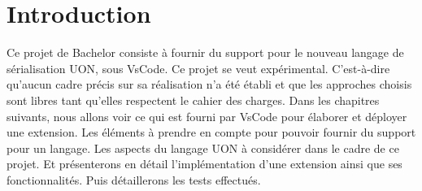\documentclass[
    iict, %
    il, %
]{heig-tb}
\begin{document}
\maketitle
\frontmatter
\clearemptydoublepage

\preamble
\let\cleardoublepage\clearpage
\authentification
\let\cleardoublepage\clearpage

\begin{abstract}
    
\end{abstract}

\listoffigures
{}
\listoflistings
{}

\tableofcontents

\printnomenclature
\clearemptydoublepage
{}

\pagestyle{fancy}
\fancyhf{}
\renewcommand\headrulewidth{1pt}

\fancyhead[L]{\itshape\nouppercase{\leftmark}}

\renewcommand{\chaptermark}[1]{\markboth{\MakeUppercase{#1}}{}}

\renewcommand\footrulewidth{1pt}


\renewcommand{\headrulewidth}{0.4pt}
\renewcommand{\footrulewidth}{0.4pt}

\titlespacing*{\chapter}{0pt}{-40pt}{20pt}


\mainmatter
\chapter{Introduction}
Ce projet de Bachelor consiste à fournir du support pour le nouveau langage de sérialisation UON, sous VsCode. Ce projet se veut expérimental. C'est-à-dire qu'aucun cadre précis sur sa réalisation n'a été établi et que les approches choisis sont libres tant qu'elles respectent le cahier des charges.
Dans les chapitres suivants, nous allons voir ce qui est fourni par VsCode pour élaborer et déployer une extension.
Les éléments à prendre en compte pour pouvoir fournir du support pour un langage.
Les aspects du langage UON à considérer dans le cadre de ce projet.
Et présenterons en détail l'implémentation d'une extension ainsi que ses fonctionnalités. Puis détaillerons les tests effectués.
\end{document}
